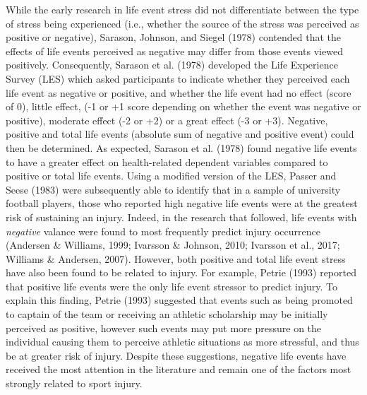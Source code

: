 \documentclass[man,floatsintext]{apa6}
\begin{document}
While the early research in life event stress did not differentiate between the type of stress being experienced (i.e., whether the source of the stress was perceived as positive or negative), Sarason, Johnson, and Siegel (1978)
contended that the effects of life events perceived as negative may differ from those events viewed positively.
Consequently, Sarason et al. (1978)
developed the Life Experience Survey (LES) which asked participants to indicate whether they perceived each life event as negative or positive, and whether the life event had no effect (score of 0), little effect, (-1 or +1 score depending on whether the event was negative or positive), moderate effect (-2 or +2) or a great effect (-3 or +3).
Negative, positive and total life events (absolute sum of negative and positive event) could then be determined. As expected, Sarason et al. (1978) found negative life events to have a greater effect on health-related dependent variables compared to positive or total life events.
Using a modified version of the LES, Passer and Seese (1983) were subsequently able to identify that in a sample of university football players, those who reported high negative life events were at the greatest risk of sustaining an injury.
Indeed, in the research that followed, life events with \emph{negative} valance were found to most frequently predict injury occurrence (Andersen \& Williams, 1999; Ivarsson \& Johnson, 2010; Ivarsson et al., 2017; Williams \& Andersen, 2007).
However, both positive and total life event stress have also been found to be related to injury.
For example, Petrie (1993) reported that positive life events were the only life event stressor to predict injury.
To explain this finding, Petrie (1993) suggested that events such as being promoted to captain of the team or receiving an athletic scholarship may be initially perceived as positive, however such events may put more pressure on the individual causing them to perceive athletic situations as more stressful, and thus be at greater risk of injury.
Despite these suggestions, negative life events have received the most attention in the literature and remain one of the factors most strongly related to sport injury.
\end{document}
